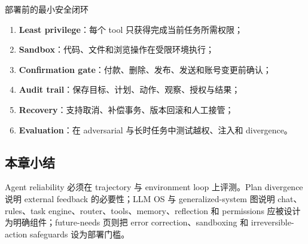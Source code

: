 \begin{importantbox}{部署前的最小安全闭环}
\begin{enumerate}
  \item \textbf{Least privilege}：每个 tool 只获得完成当前任务所需权限；
  \item \textbf{Sandbox}：代码、文件和浏览操作在受限环境执行；
  \item \textbf{Confirmation gate}：付款、删除、发布、发送和账号变更前确认；
  \item \textbf{Audit trail}：保存目标、计划、动作、观察、授权与结果；
  \item \textbf{Recovery}：支持取消、补偿事务、版本回滚和人工接管；
  \item \textbf{Evaluation}：在 adversarial 与长时任务中测试越权、注入和 divergence。
\end{enumerate}
\end{importantbox}


\subsection{本章小结}

Agent reliability 必须在 trajectory 与 environment loop 上评测。Plan divergence 说明 external feedback 的必要性；LLM OS 与 generalized-system 图说明 chat、rules、task engine、router、tools、memory、reflection 和 permissions 应被设计为明确组件；future-needs 页则把 error correction、sandboxing 和 irreversible-action safeguards 设为部署门槛。

